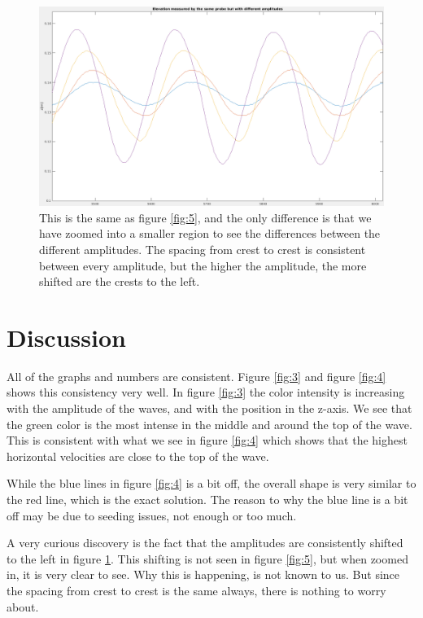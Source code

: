 \documentclass[english,a4paper,12pt]{article}
\begin{document}
\begin{figure}[H]
    \centering
    \includegraphics[width=160mm]{B_zoom.png}
    \caption{This is the same as figure \ref{fig:5}, and the only difference is that we have zoomed into a smaller region to see the differences between the different amplitudes. The spacing from crest to crest is consistent between every amplitude, but the higher the amplitude, the more shifted are the crests to the left.}
    \label{fig:6}
\end{figure}


\section*{Discussion}
All of the graphs and numbers are consistent. Figure \ref{fig:3} and figure \ref{fig:4} shows this consistency very well. In figure \ref{fig:3} the color intensity is increasing with the amplitude of the waves, and with the position in the z-axis. We see that the green color is the most intense in the middle and around the top of the wave. This is consistent with what we see in figure \ref{fig:4} which shows that the highest horizontal velocities are close to the top of the wave. \\ \bigskip

While the blue lines in figure \ref{fig:4} is a bit off, the overall shape is very similar to the red line, which is the exact solution. The reason to why the blue line is a bit off may be due to seeding issues, not enough or too much. \\ \bigskip

A very curious discovery is the fact that the amplitudes are consistently shifted to the left in figure \ref{fig:6}. This shifting is not seen in figure \ref{fig:5}, but when zoomed in, it is very clear to see. Why this is happening, is not known to us. But since the spacing from crest to crest is the same always, there is nothing to worry about.\\ \bigskip
\end{document}
